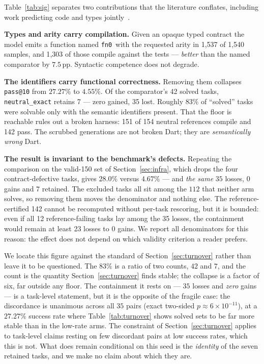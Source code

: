 \documentclass[conference]{IEEEtran}
\makeatletter
\newcommand{\passat}[1]{\texttt{pass@#1}\xspace}
\newcommand{\pp}{\,pp\xspace}
\newcommand{\fnz}{\texttt{fn0}\xspace}
\makeatother
\begin{document}
Table~\ref{tab:sig} separates two contributions that the literature conflates,
including work predicting code and types jointly~\cite{dramko2025idioms}.

\textbf{Types and arity carry compilation.} Given an opaque typed contract the
model emits a function named \fnz\ with the requested arity in 1{,}537 of 1{,}540
samples, and 1{,}303 of those compile against the tests --- \emph{better} than the
named comparator by $7.5$\pp. Syntactic competence does not degrade.

\textbf{The identifiers carry functional correctness.} Removing them
collapses \passat{10} from $27.27\%$ to $4.55\%$. Of the comparator's 42 solved
tasks, \texttt{neutral\_exact} retains 7 --- zero gained, 35 lost. Roughly $83\%$
of ``solved'' tasks were solvable only with the semantic identifiers present.
That the floor is
reachable rules out a broken harness: 151 of 154 neutral references compile and
142 pass. The scrubbed generations are not broken Dart; they are
\emph{semantically wrong} Dart.

\textbf{The result is invariant to the benchmark's defects.} Repeating the
comparison on the valid-150 set of Section~\ref{sec:infra}, which drops the four
contract-defective tasks, gives $28.0\%$ versus $4.67\%$ --- and \emph{the same}
$35$ losses, $0$ gains and $7$ retained. The excluded tasks all sit among the
$112$ that neither arm solves, so removing them moves the denominator and nothing
else. The reference-certified 142 cannot be recomputed without per-task
rescoring, but it is bounded: even if all 12 reference-failing tasks lay among
the 35 losses, the containment would remain at least 23 losses to 0 gains. We
report all denominators for this reason: the effect does not depend on which
validity criterion a reader prefers.

We locate this figure against the standard of Section~\ref{sec:turnover} rather
than leave it to be questioned. The $83\%$ is a ratio of two counts, $42$ and
$7$, and the count is the quantity Section~\ref{sec:turnover} finds stable; the
collapse is a factor of six, far outside any floor. The containment it rests on
--- $35$ losses and \emph{zero} gains --- is a task-level statement, but it is
the opposite of the fragile case: the discordance is unanimous across all $35$
pairs (exact two-sided $p{\approx}6\times10^{-11}$), at a $27.27\%$ success rate
where Table~\ref{tab:turnover} shows solved sets to be far more stable than in
the low-rate arms. The constraint of Section~\ref{sec:turnover} applies to
task-level claims resting on few discordant pairs at low success rates, which
this is not. What does remain conditional on this seed is the \emph{identity} of
the seven retained tasks, and we make no claim about which they are.
\end{document}
